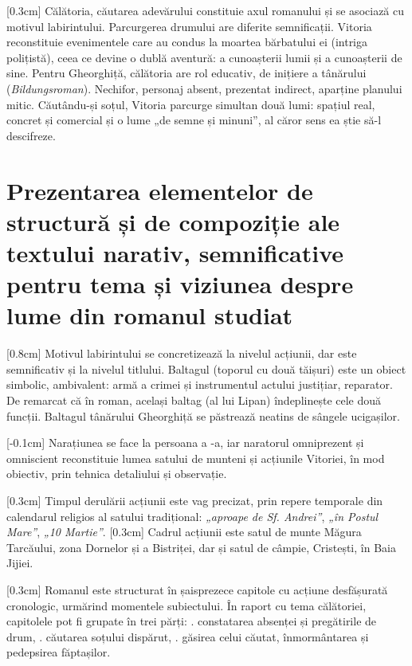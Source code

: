 [0.3cm]
Călătoria, căutarea adevărului constituie axul romanului și se asociază cu motivul labirintului. Parcurgerea drumului are diferite semnificații. Vitoria reconstituie evenimentele care au condus la moartea bărbatului ei (intriga polițistă), ceea ce devine o dublă aventură: a cunoașterii lumii și a cunoașterii de sine. Pentru Gheorghiță, călătoria are rol educativ, de inițiere a tânărului (\textit{Bildungsroman}). Nechifor, personaj absent, prezentat indirect, aparține planului mitic. Căutându-și soțul, Vitoria parcurge simultan două lumi: spațiul real, concret și comercial și o lume „de semne și minuni”, al căror sens ea știe să-l descifreze.


\section{Prezentarea elementelor de structură și de compoziție ale textului narativ, semnificative pentru tema și viziunea despre lume din romanul studiat}%

[0.8cm]
Motivul labirintului se concretizează la nivelul acțiunii, dar este semnificativ și la nivelul titlului. Baltagul (toporul cu două tăișuri) este un obiect simbolic, ambivalent: armă a crimei și instrumentul actului justițiar, reparator. De remarcat că în roman, același baltag (al lui Lipan) îndeplinește cele două funcții. Baltagul tânărului Gheorghiță se păstrează neatins de sângele ucigașilor.

[-0.1cm]
Narațiunea se face la persoana a -a, iar naratorul omniprezent și omniscient reconstituie lumea satului de munteni și acțiunile Vitoriei, în mod obiectiv, prin tehnica detaliului și observație.

[0.3cm]
Timpul derulării acțiunii este vag precizat, prin repere temporale din calendarul religios al satului tradițional: \textit{„aproape de Sf. Andrei”}, \textit{„în Postul Mare”}, \textit{„10 Martie”}.
[0.3cm]
Cadrul acțiunii este satul de munte Măgura Tarcăului, zona Dornelor și a Bistriței, dar și satul de câmpie, Cristești, în Baia Jijiei.

[0.3cm]
Romanul este structurat în șaisprezece capitole cu acțiune desfășurată cronologic, urmărind momentele subiectului. În raport cu tema călătoriei, capitolele pot fi grupate în trei părți: . constatarea absenței și pregătirile de drum, . căutarea soțului dispărut, . găsirea celui căutat, înmormântarea și pedepsirea făptașilor.

